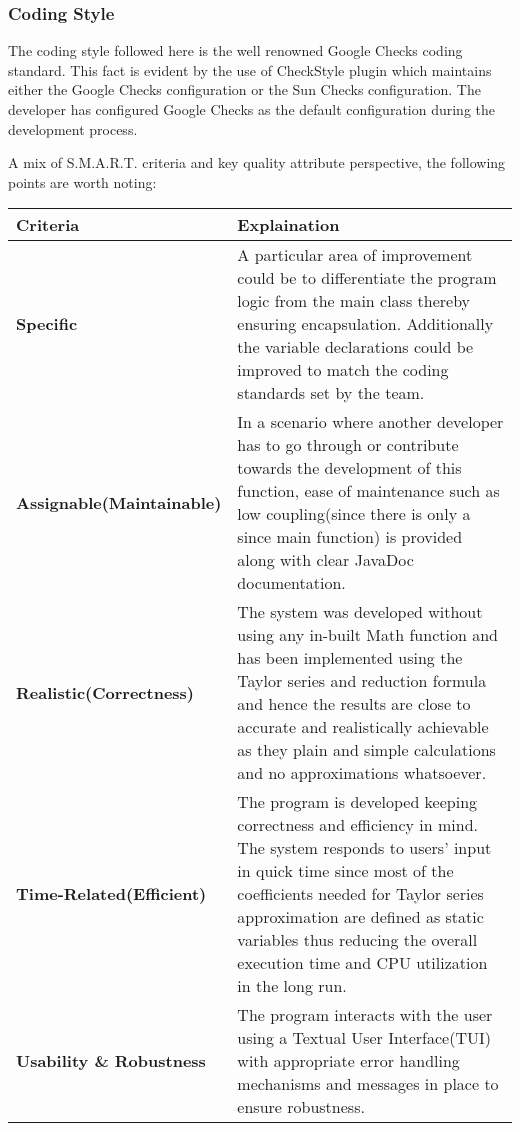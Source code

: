 \documentclass[12pt]{report}
\begin{document}
	\subsubsection{Coding Style}The coding style followed here is the well renowned Google Checks coding standard. This fact is evident by the use of CheckStyle plugin which maintains either the Google Checks configuration or the Sun Checks configuration. The developer has configured Google Checks as the default configuration during the development process.\par
	A mix of S.M.A.R.T. criteria and key quality attribute perspective, the following points are worth noting:
	\begin{center}
	\begin{tabular}{|p{5.2cm}|p{10cm}|}
	\hline
	Criteria&Explaination\\
	\hline
	\vspace{0.1cm}\textbf{Specific}&\vspace{0.1cm} A particular area of improvement could be to differentiate the program logic from the main class thereby ensuring encapsulation. Additionally the variable declarations could be improved to match the coding standards set by the team.\\
	\vspace{0.12cm}\textbf{Assignable(Maintainable)}&\vspace{0.1cm}In a scenario where another developer has to go through or contribute towards the development of this function, ease of maintenance such as low coupling(since there is only a since main function) is provided along with clear JavaDoc documentation.\\
	\vspace{0.12cm}\textbf{Realistic(Correctness)}&\vspace{0.1cm}The system was developed without using any in-built Math function and has been implemented using the Taylor series and reduction formula and hence the results are close to accurate and realistically achievable as they plain and simple calculations and no approximations whatsoever.\\
	\vspace{0.05cm}\textbf{Time-Related(Efficient)}&\vspace{0.05cm} The program is developed keeping correctness and efficiency in mind. The system responds to users' input in quick time since most of the coefficients needed for Taylor series approximation are defined as static variables thus reducing the overall execution time and CPU utilization in the long run.\\
	\vspace{0.05cm}\textbf{Usability \& Robustness}&\vspace{0.05cm} The program interacts with the user using a Textual User Interface(TUI) with appropriate error handling mechanisms and messages in place to ensure robustness.\\ 
	\hline
	\end{tabular}
	\end{center}
\end{document}
